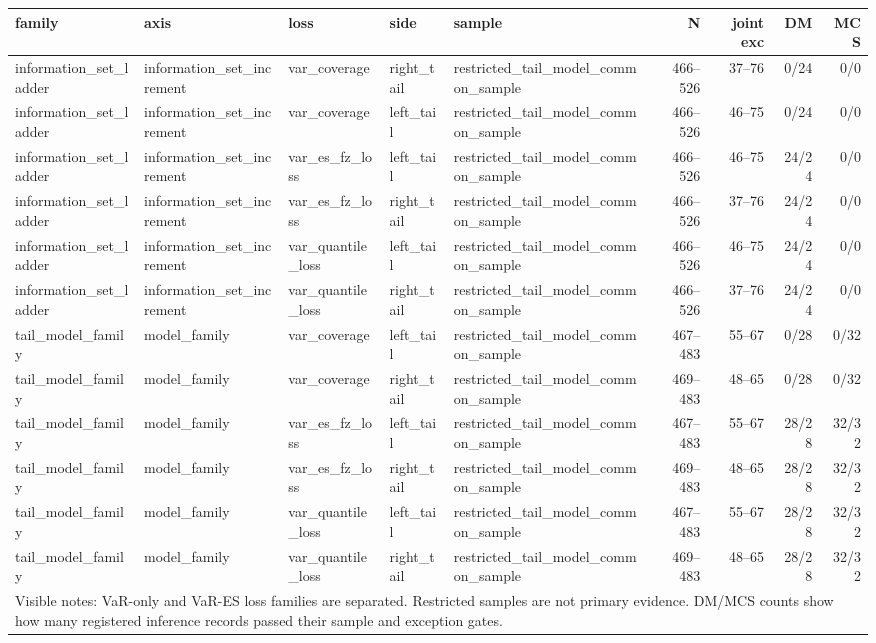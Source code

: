 \begin{tabular}{lllllrrrr}
\toprule
family & axis & loss & side & sample & N & joint exc & DM & MCS \\
\midrule
information\_set\_ladder & information\_set\_increment & var\_coverage & right\_tail & restricted\_tail\_model\_common\_sample & 466--526 & 37--76 & 0/24 & 0/0 \\
information\_set\_ladder & information\_set\_increment & var\_coverage & left\_tail & restricted\_tail\_model\_common\_sample & 466--526 & 46--75 & 0/24 & 0/0 \\
information\_set\_ladder & information\_set\_increment & var\_es\_fz\_loss & left\_tail & restricted\_tail\_model\_common\_sample & 466--526 & 46--75 & 24/24 & 0/0 \\
information\_set\_ladder & information\_set\_increment & var\_es\_fz\_loss & right\_tail & restricted\_tail\_model\_common\_sample & 466--526 & 37--76 & 24/24 & 0/0 \\
information\_set\_ladder & information\_set\_increment & var\_quantile\_loss & left\_tail & restricted\_tail\_model\_common\_sample & 466--526 & 46--75 & 24/24 & 0/0 \\
information\_set\_ladder & information\_set\_increment & var\_quantile\_loss & right\_tail & restricted\_tail\_model\_common\_sample & 466--526 & 37--76 & 24/24 & 0/0 \\
tail\_model\_family & model\_family & var\_coverage & left\_tail & restricted\_tail\_model\_common\_sample & 467--483 & 55--67 & 0/28 & 0/32 \\
tail\_model\_family & model\_family & var\_coverage & right\_tail & restricted\_tail\_model\_common\_sample & 469--483 & 48--65 & 0/28 & 0/32 \\
tail\_model\_family & model\_family & var\_es\_fz\_loss & left\_tail & restricted\_tail\_model\_common\_sample & 467--483 & 55--67 & 28/28 & 32/32 \\
tail\_model\_family & model\_family & var\_es\_fz\_loss & right\_tail & restricted\_tail\_model\_common\_sample & 469--483 & 48--65 & 28/28 & 32/32 \\
tail\_model\_family & model\_family & var\_quantile\_loss & left\_tail & restricted\_tail\_model\_common\_sample & 467--483 & 55--67 & 28/28 & 32/32 \\
tail\_model\_family & model\_family & var\_quantile\_loss & right\_tail & restricted\_tail\_model\_common\_sample & 469--483 & 48--65 & 28/28 & 32/32 \\
\midrule
\multicolumn{9}{l}{\footnotesize Visible notes: VaR-only and VaR-ES loss families are separated. Restricted samples are not primary evidence. DM/MCS counts show how many registered inference records passed their sample and exception gates.} \\
\bottomrule
\end{tabular}
